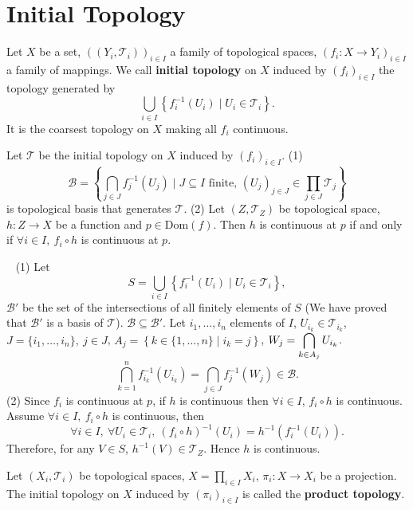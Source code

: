 \section{Initial Topology}
\begin{definitionenv}
    Let $X$ be a set, $\left((Y_i,\mathscr{T}_i)\right)_{i\in I}$ a family of topological spaces, $\left(f_i:X\longrightarrow Y_i\right)_{i\in I}$ a family of mappings. We call \textbf{initial topology} on $X$ induced by $\left(f_i\right)_{i\in I}$ the topology generated by 
    $$\bigcup_{i\in I}\left\{f^{-1}_i(U_i)\mid U_i\in \mathscr{T}_i\right\}.$$
    It is the coarsest topology on $X$ making all $f_i$ continuous.
\end{definitionenv}
\begin{propositionenv}
    Let $\mathscr{T}$ be the initial topology on $X$ induced by $\left(f_i\right)_{i\in I}$. 
    \newline
    (1) $$\mathcal{B}= \left\{ \bigcap_{j\in J}f^{-1}_j(U_j)\mid J\subseteq I \text{ finite, }\left(U_j\right)_{j\in J}\in \prod_{j\in J}\mathscr{T}_j\right\}$$
    is topological basis that generates $\mathscr{T}$.
    \newline
    (2) Let $(Z,\mathscr{T}_Z)$ be topological space, $h:Z\longrightarrow X$ be a function and $p\in \mathrm{Dom}(f)$. Then $h$ is continuous at $p$ if and only if $\forall i\in I,\ f_i\circ h$ is continuous at $p$.
\end{propositionenv}
\begin{proofenv}
    \ \newline
    (1) Let 
    $$S=\bigcup_{i\in I}\left\{f^{-1}_{i}\left(U_i\right)\mid U_i\in \mathscr{T}_i\right\},$$
    $\mathcal{B}'$ be the set of the intersections of all finitely elements of $S$ (We have proved that $\mathcal{B}'$ is a basis of $\mathscr{T}$). $\mathcal{B}\subseteq\mathcal{B}'$. Let $i_1,\dots, i_n$ elements of $I$, $U_{i_k}\in \mathscr{T}_{i_k}$, $J=\{i_1,\dots,i_n\},\ j\in J$, $A_j=\left\{k\in\{1,\dots,n\}\mid i_k=j\right\}$, $\displaystyle W_j=\bigcap_{k\in A_j}U_{i_k}$.
    $$\bigcap_{k=1}^{n}f^{-1}_{i_k}\left(U_{i_k}\right)=\bigcap_{j\in J}f^{-1}_{j}\left(W_j\right)\in \mathcal{B}.$$
    (2) Since $f_i$ is continuous at $p$, if $h$ is continuous then $\forall i\in I$, $f_i\circ h$ is continuous. Assume $\forall i\in I,\ f_i\circ h$ is continuous, then 
    $$\forall i\in I,\ \forall U_i\in \mathscr{T}_i,\ \left(f_i\circ h\right)^{-1}\left(U_i\right)=h^{-1}\left(f_i^{-1}\left(U_i\right)\right).$$
    Therefore, for any $V\in S$, $h^{-1}(V)\in \mathscr{T}_Z.$ Hence $h$ is continuous.
\end{proofenv}
\begin{exampleenv}
    Let $(X_i,\mathscr{T}_i)$ be topological spaces, $X=\prod_{i\in I}X_i$, $\pi_i:X\longrightarrow X_i$ be a projection. The initial topology on $X$ induced by $(\pi_i)_{i\in I}$ is called the \textbf{product topology}.
\end{exampleenv}



